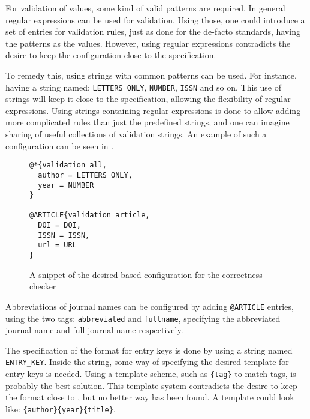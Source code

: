 For validation of values, some kind of valid patterns are required.
In general regular expressions can be used for validation.  Using
those, one could introduce a set of entries for validation rules, just
as done for the de-facto standards, having the patterns as the values.
However, using regular expressions contradicts the desire to keep the
configuration close to the {\bibtex} specification.

To remedy this, using strings with common patterns can be used.  For
instance, having a string named: \texttt{LETTERS\_ONLY},
\texttt{NUMBER}, \texttt{ISSN} and so on.  This use of strings will
keep it close to the {\bibtex} specification, allowing the flexibility
of regular expressions.  Using strings containing regular expressions
is done to allow adding more complicated rules than just the
predefined strings, and one can imagine sharing of useful collections
of validation strings.  An example of such a configuration can be seen
in .

\begin{figure}
  \centering
\begin{verbatim}
@*{validation_all,
  author = LETTERS_ONLY,
  year = NUMBER
}

@ARTICLE{validation_article,
  DOI = DOI,
  ISSN = ISSN,
  url = URL
}
\end{verbatim}
  \caption{A snippet of the desired {\bibtex} based configuration for
    the correctness checker}
  \label{fig:analyzing_validation_config}
\end{figure}

Abbreviations of journal names can be configured by adding
\texttt{@ARTICLE} entries, using the two tags: \texttt{abbreviated}
and \texttt{fullname}, specifying the abbreviated journal name and
full journal name respectively.


The specification of the format for entry keys is done by using a
{\bibtex} string named \texttt{ENTRY\_KEY}.  Inside
the string, some way of specifying the desired template for entry keys
is needed.  Using a template scheme, such as \texttt{\{tag\}} to match
tags, is probably the best solution.  This template system contradicts
the desire to keep the format close to {\bibtex}, but no better way
has been found.  A template could look like:
\texttt{\{author\}\{year\}\{title\}}.

